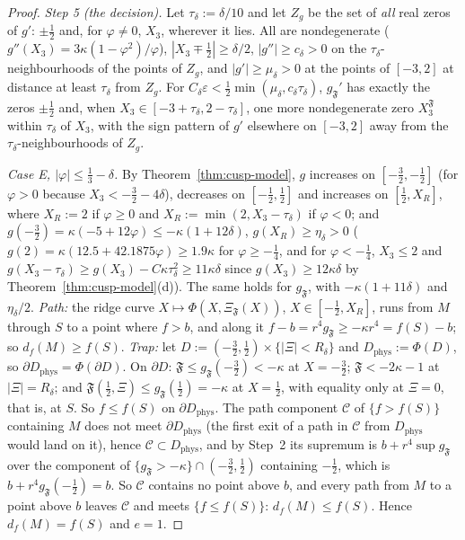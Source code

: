 \begin{proof}
\emph{Step 5 (the decision).} Let $\tau_\delta:=\delta/10$ and let $Z_g$ be the set of \emph{all} real zeros of $g'$: $\pm\frac12$ and, for $\varphi\ne0$, $X_3$, wherever it lies. All are nondegenerate ($g''(X_3)=3\kappa(1-\varphi^2)/\varphi$), $|X_3\mp\frac12|\ge\delta/2$, $|g''|\ge c_\delta>0$ on the $\tau_\delta$-neighbourhoods of the points of $Z_g$, and $|g'|\ge\mu_\delta>0$ at the points of $[-3,2]$ at distance at least $\tau_\delta$ from $Z_g$. For $C_\delta\varepsilon<\frac12\min(\mu_\delta,c_\delta\tau_\delta)$, $g_{\mathfrak F}'$ has exactly the zeros $\pm\frac12$ and, when $X_3\in[-3+\tau_\delta,2-\tau_\delta]$, one more nondegenerate zero $X_3^{\mathfrak F}$ within $\tau_\delta$ of $X_3$, with the sign pattern of $g'$ elsewhere on $[-3,2]$ away from the $\tau_\delta$-neighbourhoods of $Z_g$.

\emph{Case E, $|\varphi|\le\frac13-\delta$.} By Theorem~\ref{thm:cusp-model}, $g$ increases on $[-\frac32,-\frac12]$ (for $\varphi>0$ because $X_3<-\frac32-4\delta$), decreases on $[-\frac12,\frac12]$ and increases on $[\frac12,X_R]$, where $X_R:=2$ if $\varphi\ge0$ and $X_R:=\min(2,X_3-\tau_\delta)$ if $\varphi<0$; and $g(-\frac32)=\kappa(-5+12\varphi)\le-\kappa(1+12\delta)$, $g(X_R)\ge\eta_\delta>0$ ($g(2)=\kappa(12.5+42.1875\varphi)\ge1.9\kappa$ for $\varphi\ge-\frac14$, and for $\varphi<-\frac14$, $X_3\le2$ and $g(X_3-\tau_\delta)\ge g(X_3)-C\kappa\tau_\delta^2\ge11\kappa\delta$ since $g(X_3)\ge12\kappa\delta$ by Theorem~\ref{thm:cusp-model}(d)). The same holds for $g_{\mathfrak F}$, with $-\kappa(1+11\delta)$ and $\eta_\delta/2$. \emph{Path:} the ridge curve $X\mapsto\Phi(X,\Xi_{\mathfrak F}(X))$, $X\in[-\frac12,X_R]$, runs from $M$ through $S$ to a point where $f>b$, and along it $f-b=r^4g_{\mathfrak F}\ge-\kappa r^4=f(S)-b$; so $d_f(M)\ge f(S)$. \emph{Trap:} let $D:=(-\frac32,\frac12)\times\{|\Xi|<R_\delta\}$ and $D_{\mathrm{phys}}:=\Phi(D)$, so $\partial D_{\mathrm{phys}}=\Phi(\partial D)$. On $\partial D$: $\mathfrak F\le g_{\mathfrak F}(-\frac32)<-\kappa$ at $X=-\frac32$; $\mathfrak F<-2\kappa-1$ at $|\Xi|=R_\delta$; and $\mathfrak F(\frac12,\Xi)\le g_{\mathfrak F}(\frac12)=-\kappa$ at $X=\frac12$, with equality only at $\Xi=0$, that is, at $S$. So $f\le f(S)$ on $\partial D_{\mathrm{phys}}$. The path component $\mathcal C$ of $\{f>f(S)\}$ containing $M$ does not meet $\partial D_{\mathrm{phys}}$ (the first exit of a path in $\mathcal C$ from $D_{\mathrm{phys}}$ would land on it), hence $\mathcal C\subset D_{\mathrm{phys}}$, and by Step~2 its supremum is $b+r^4\sup g_{\mathfrak F}$ over the component of $\{g_{\mathfrak F}>-\kappa\}\cap(-\frac32,\frac12)$ containing $-\frac12$, which is $b+r^4g_{\mathfrak F}(-\frac12)=b$. So $\mathcal C$ contains no point above $b$, and every path from $M$ to a point above $b$ leaves $\mathcal C$ and meets $\{f\le f(S)\}$: $d_f(M)\le f(S)$. Hence $d_f(M)=f(S)$ and $e=1$.


\end{proof}
